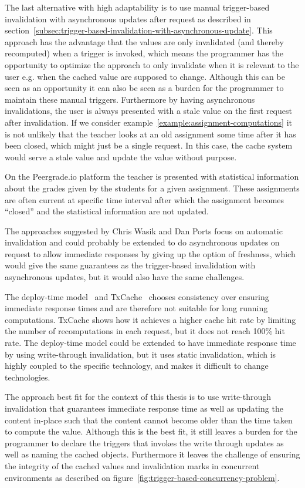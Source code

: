 The last alternative with high adaptability is to use manual trigger-based invalidation with asynchronous updates after request as described in section~\ref{subsec:trigger-based-invalidation-with-asynchronous-update}. This approach has the advantage that the values are only invalidated (and thereby recomputed) when a trigger is invoked, which means the programmer has the opportunity to optimize the approach to only invalidate when it is relevant to the user e.g. when the cached value are supposed to change. Although this can be seen as an opportunity it can also be seen as a burden for the programmer to maintain these manual triggers. Furthermore by having asynchronous invalidations, the user is always presented with a stale value on the first request after invalidation. If we consider example~\ref{example:assignment-computations} it is not unlikely that the teacher looks at an old assignment some time after it has been closed, which might just be a single request. In this case, the cache system would serve a stale value and update the value without purpose.
\begin{example}
\label{example:assignment-computations}
On the Peergrade.io platform the teacher is presented with statistical information about the grades given by the students for a given assignment. These assignments are often current at specific time interval after which the assignment becomes ``closed'' and the statistical information are not updated.
\end{example}
The approaches suggested by Chris Wasik and Dan Ports focus on automatic invalidation and could probably be extended to do asynchronous updates on request to allow immediate responses by giving up the option of freshness, which would give the same guarantees as the trigger-based invalidation with asynchronous updates, but it would also have the same challenges.

The deploy-time model~\cite{paper:deploy-time} and TxCache~\cite{paper:liskov} chooses consistency over ensuring immediate response times and are therefore not suitable for long running computations. TxCache shows how it achieves a higher cache hit rate by limiting the number of recomputations in each request, but it does not reach 100\% hit rate. The deploy-time model could be extended to have immediate response time by using write-through invalidation, but it uses static invalidation, which is highly coupled to the specific technology, and makes it difficult to change technologies.

The approach best fit for the context of this thesis is to use write-through invalidation that guarantees immediate response time as well as updating the content in-place such that the content cannot become older than the time taken to compute the value. Although this is the best fit, it still leaves a burden for the programmer to declare the triggers that invokes the write through updates as well as naming the cached objects. Furthermore it leaves the challenge of ensuring the integrity of the cached values and invalidation marks in concurrent environments as described on figure~\ref{fig:trigger-based-concurrency-problem}.

